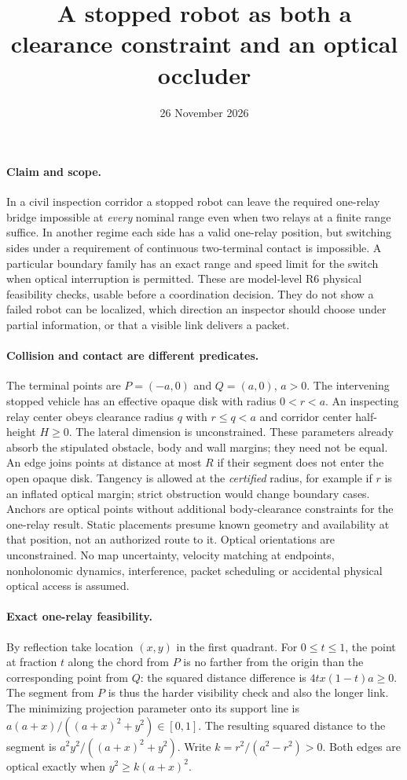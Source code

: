 \documentclass{article}
\title{A stopped robot as both a clearance constraint and an optical occluder}
\date{26 November 2026}
\begin{document}
\maketitle
\paragraph{Claim and scope.}
In a civil inspection corridor a stopped robot can leave the required
one-relay bridge impossible at \emph{every} nominal range even when two
relays at a finite range suffice. In another regime each side has a valid
one-relay position, but switching sides under a requirement of continuous
two-terminal contact is impossible. A particular boundary family has an
exact range and speed limit for the switch when optical interruption is
permitted. These are model-level R6 physical feasibility checks, usable
before a coordination decision. They do not show a failed robot can be
localized, which direction an inspector should choose under partial
information, or that a visible link delivers a packet.

\paragraph{Collision and contact are different predicates.}
The terminal points are \(P=(-a,0)\) and \(Q=(a,0)\), \(a>0\).
The intervening stopped vehicle has an effective opaque disk with radius
\(0<r<a\). An inspecting relay center obeys clearance radius \(q\) with
\(r\le q<a\) and corridor center half-height \(H\ge0\).
The lateral dimension is unconstrained. These parameters already absorb
the stipulated obstacle, body and wall margins; they need not be equal.
An edge joins points at distance at most \(R\) if their segment does not
enter the open opaque disk. Tangency is allowed at the \emph{certified}
radius, for example if \(r\) is an inflated optical margin; strict
obstruction would change boundary cases. Anchors are optical points
without additional body-clearance constraints for the one-relay result.
Static placements presume known geometry and availability at that
position, not an authorized route to it. Optical orientations are
unconstrained. No map uncertainty, velocity matching at endpoints,
nonholonomic dynamics, interference, packet scheduling or accidental
physical optical access is assumed.

\paragraph{Exact one-relay feasibility.}
By reflection take location \((x,y)\) in the first quadrant. For
\(0\le t\le1\), the point at fraction \(t\) along the chord from \(P\) is
no farther from the origin than the corresponding point from \(Q\):
the squared distance difference is \(4tx(1-t)a\ge0\).
The segment from \(P\) is thus the harder visibility check and
also the longer link. The minimizing projection parameter onto its
support line is \(a(a+x)/((a+x)^2+y^2)\in[0,1]\).
The resulting squared distance to the segment is
\(a^2y^2/((a+x)^2+y^2)\). Write \(k=r^2/(a^2-r^2)>0\).
Both edges are optical exactly when \(y^2\ge k(a+x)^2\).
\end{document}

